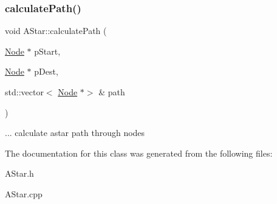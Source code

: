 \subsubsection{\texorpdfstring{calculate\+Path()}{calculatePath()}}
{\footnotesize\ttfamily void A\+Star\+::calculate\+Path (\begin{DoxyParamCaption}\item[{\mbox{\hyperlink{class_node}{Node}} $\ast$}]{p\+Start,  }\item[{\mbox{\hyperlink{class_node}{Node}} $\ast$}]{p\+Dest,  }\item[{std\+::vector$<$ \mbox{\hyperlink{class_node}{Node}} $\ast$$>$ \&}]{path }\end{DoxyParamCaption})}

... calculate astar path through nodes

The documentation for this class was generated from the following files\+:\begin{DoxyCompactItemize}
\item 
A\+Star.\+h\item 
A\+Star.\+cpp\end{DoxyCompactItemize}
